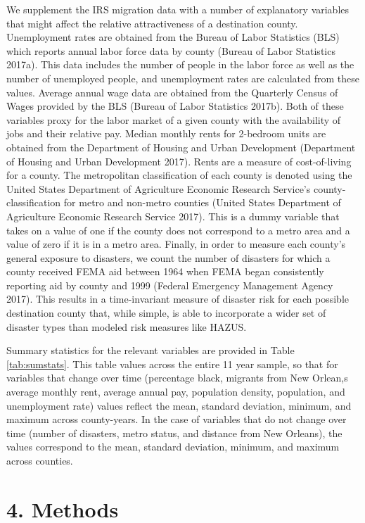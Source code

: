 \documentclass[]{article}
\begin{document}
We supplement the IRS migration data with a number of explanatory
variables that might affect the relative attractiveness of a destination
county. Unemployment rates are obtained from the Bureau of Labor
Statistics (BLS) which reports annual labor force data by county (Bureau
of Labor Statistics 2017a). This data includes the number of people in
the labor force as well as the number of unemployed people, and
unemployment rates are calculated from these values. Average annual wage
data are obtained from the Quarterly Census of Wages provided by the BLS
(Bureau of Labor Statistics 2017b). Both of these variables proxy for
the labor market of a given county with the availability of jobs and
their relative pay. Median monthly rents for 2-bedroom units are
obtained from the Department of Housing and Urban Development
(Department of Housing and Urban Development 2017). Rents are a measure
of cost-of-living for a county. The metropolitan classification of each
county is denoted using the United States Department of Agriculture
Economic Research Service's county-classification for metro and
non-metro counties (United States Department of Agriculture Economic
Research Service 2017). This is a dummy variable that takes on a value
of one if the county does not correspond to a metro area and a value of
zero if it is in a metro area. Finally, in order to measure each
county's general exposure to disasters, we count the number of disasters
for which a county received FEMA aid between 1964 when FEMA began
consistently reporting aid by county and 1999 (Federal Emergency
Management Agency 2017). This results in a time-invariant measure of
disaster risk for each possible destination county that, while simple,
is able to incorporate a wider set of disaster types than modeled risk
measures like HAZUS.

Summary statistics for the relevant variables are provided in Table
\ref{tab:sumstats}. This table values across the entire 11 year sample,
so that for variables that change over time (percentage black, migrants
from New Orlean,s average monthly rent, average annual pay, population
density, population, and unemployment rate) values reflect the mean,
standard deviation, minimum, and maximum across county-years. In the
case of variables that do not change over time (number of disasters,
metro status, and distance from New Orleans), the values correspond to
the mean, standard deviation, minimum, and maximum across counties.

\section{4. Methods}\label{methods}
\end{document}

